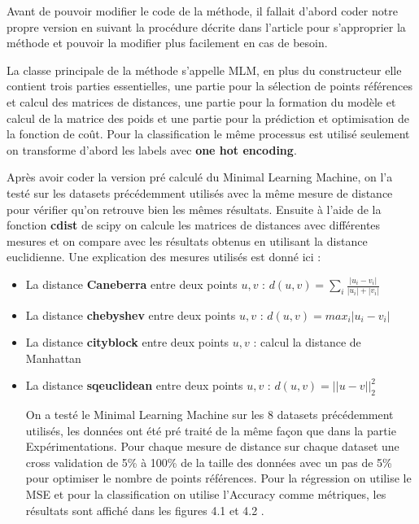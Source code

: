 \documentclass[12pt,a4paper]{report}
\begin{document}
\par Avant de pouvoir modifier le code de la méthode, il fallait d'abord coder notre propre version en suivant la procédure décrite dans l'article pour s'approprier la méthode et pouvoir la modifier plus facilement en cas de besoin.

\par La classe principale de la méthode s'appelle MLM, en plus du constructeur elle contient trois parties essentielles, une partie pour la sélection de points références et calcul des matrices de distances, une partie pour la formation du modèle et calcul de la matrice des poids et une partie pour la prédiction et optimisation de la fonction de coût. Pour la classification le même processus est utilisé seulement on transforme d'abord les labels avec \textbf{one hot encoding}. 

\par Après avoir coder la version pré calculé du Minimal Learning Machine, on l'a testé sur les datasets précédemment utilisés avec la même mesure de distance pour  vérifier qu'on retrouve bien les mêmes résultats. Ensuite à l'aide de la fonction \textbf{cdist} de scipy on calcule les matrices de distances avec différentes mesures et on compare avec les résultats obtenus en utilisant la distance euclidienne. Une explication des mesures utilisés est donné ici :
\begin{itemize}

\item La distance \textbf{Caneberra} entre deux points $u,v$ : $ d(u,v) = \sum_i{\frac{|u_i - v_i|}{|u_i| + |v_i|}}$
\item La distance \textbf{chebyshev} entre deux points $u,v$ : $ d(u,v) = max_i{|u_i - v_i|}$ 
\item La distance \textbf{cityblock} entre deux points $u,v$ : calcul la distance de Manhattan 
\item La distance \textbf{sqeuclidean} entre deux points $u,v$ : $ d(u,v) = ||u-v||_2^2$ 

\par On a testé le Minimal Learning Machine sur les 8 datasets précédemment utilisés, les données ont été pré traité de la même façon que dans la partie Expérimentations. Pour chaque mesure de distance sur chaque dataset une cross validation de 5\% à 100\% de la taille des données avec un pas de 5\% pour optimiser le nombre de points références. Pour la régression on utilise le MSE et pour la classification on utilise l'Accuracy comme métriques, les résultats sont affiché dans les figures 4.1 et 4.2 . 
\end{itemize}
\end{document}

